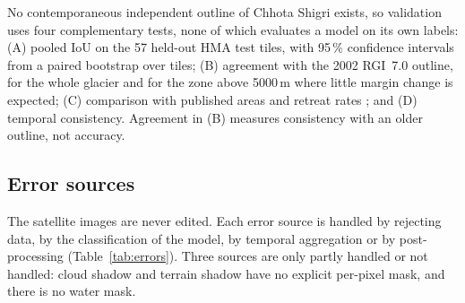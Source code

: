 \documentclass[pdflatex,sn-mathphys-num]{sn-jnl}%
\theoremstyle{thmstyleone}%
\theoremstyle{thmstyletwo}%
\theoremstyle{thmstylethree}%
\begin{document}
No contemporaneous independent outline of Chhota Shigri exists, so validation uses four complementary tests, none of which evaluates a model on its own labels: (A) pooled IoU on the 57 held-out HMA test tiles, with 95\,\% confidence intervals from a paired bootstrap over tiles; (B) agreement with the 2002 RGI~7.0 outline, for the whole glacier and for the zone above 5000\,m where little margin change is expected; (C) comparison with published areas and retreat rates \cite{wagnon2007,mandal2020,gantayat2017}; and (D) temporal consistency. Agreement in (B) measures consistency with an older outline, not accuracy.

\subsection{Error sources}\label{subsec3.11}

The satellite images are never edited. Each error source is handled by rejecting data, by the classification of the model, by temporal aggregation or by post-processing (Table~\ref{tab:errors}). Three sources are only partly handled or not handled: cloud shadow and terrain shadow have no explicit per-pixel mask, and there is no water mask.
\end{document}
